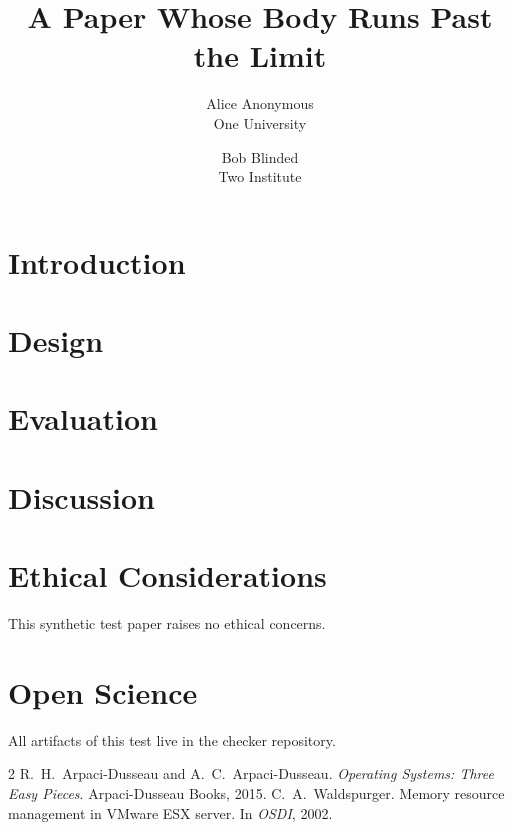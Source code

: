 \documentclass[letterpaper,twocolumn,10pt]{article}
\date{}
\title{\Large \bf A Paper Whose Body Runs Past the Limit}
\author{{\rm Alice Anonymous}\\One University \and {\rm Bob Blinded}\\Two Institute}
\begin{document}
\maketitle

\begin{abstract}
\lipsum[1][1-5]
\end{abstract}

\section{Introduction}
\lipsum[1-35]

\section{Design}
\lipsum[36-70]

\section{Evaluation}
\lipsum[71-105]

\section{Discussion}
\lipsum[106-140]

\appendix
\section*{Ethical Considerations}
This synthetic test paper raises no ethical concerns.

\section*{Open Science}
All artifacts of this test live in the checker repository.

\begin{thebibliography}{2}
 R.~H.\ Arpaci-Dusseau and A.~C.\ Arpaci-Dusseau.
  \emph{Operating Systems: Three Easy Pieces}. Arpaci-Dusseau Books, 2015.
 C.~A.\ Waldspurger. Memory resource management in VMware ESX
  server. In \emph{OSDI}, 2002.
\end{thebibliography}
\end{document}
